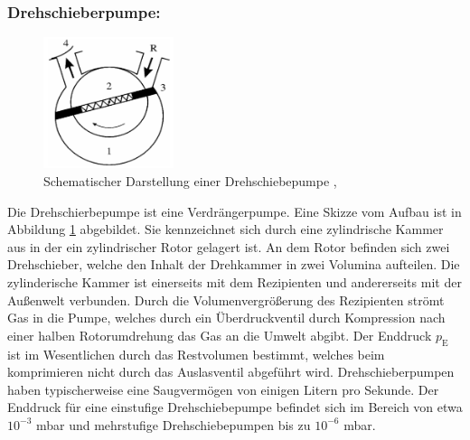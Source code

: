 \subsubsection{Drehschieberpumpe:}
\begin{figure}
    \vspace{-1cm}
    \centering
    \includegraphics[width=0.34\textwidth]{./picture/Drehschieberpumpe.png}
    \caption{Schematischer Darstellung einer Drehschiebepumpe \cite{Dreh},\cite{Jena}}
    \label{fig:Dreh}
    \vspace{-0.5cm}
\end{figure}
Die Drehschierbepumpe ist eine Verdrängerpumpe. Eine Skizze vom Aufbau ist in Abbildung \ref{fig:Dreh} abgebildet. Sie kennzeichnet sich durch eine zylindrische Kammer aus in der ein zylindrischer Rotor gelagert ist. An dem Rotor befinden sich zwei Drehschieber, welche den Inhalt der Drehkammer in zwei Volumina aufteilen. Die zylinderische Kammer ist einerseits mit dem Rezipienten und andererseits mit der Außenwelt verbunden. Durch die Volumenvergrößerung des Rezipienten strömt Gas in die Pumpe, welches durch ein Überdruckventil durch Kompression nach einer halben Rotorumdrehung das Gas an die Umwelt abgibt. Der Enddruck $p_\text{E}$ ist im Wesentlichen durch das Restvolumen bestimmt, welches beim komprimieren nicht durch das Auslasventil abgeführt wird. Drehschieberpumpen haben typischerweise eine Saugvermögen von einigen Litern pro Sekunde. Der Enddruck für eine einstufige Drehschiebepumpe befindet sich im Bereich von etwa $10^{-3}$ mbar und mehrstufige Drehschiebepumpen bis zu $10^{-6}$ mbar.
